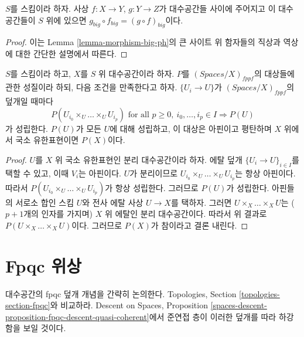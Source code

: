 \begin{lemma}
\label{lemma-composition-ph}
$S$를 스킴이라 하자. 사상 $f : X \to Y$, $g : Y \to Z$가 대수공간들
사이에 주어지고 이 대수공간들이 $S$ 위에 있으면
$g_{big} \circ f_{big} = (g \circ f)_{big}$이다.
\end{lemma}

\begin{proof}
이는 Lemma \ref{lemma-morphism-big-ph}의 큰 사이트 위 함자들의 직상과
역상에 대한 간단한 설명에서 따른다.
\end{proof}

\begin{lemma}
\label{lemma-cech-enough}
$S$를 스킴이라 하고, $X$를 $S$ 위 대수공간이라 하자. $P$를
$(\textit{Spaces}/X)_{fppf}$의 대상들에 관한 성질이라 하되, 다음 조건을
만족한다고 하자. $\{U_i \to U\}$가 $(\textit{Spaces}/X)_{fppf}$의
덮개일 때마다
$$
P(U_{i_0} \times_U \ldots \times_U U_{i_p})
\text{ for all }
p \geq 0,\ i_0, \ldots, i_p \in I
\Rightarrow P(U)
$$
가 성립한다. $P(U)$가 모든 $U$에 대해 성립하고, 이 대상은 아핀이고
평탄하며 $X$ 위에서 국소 유한표현이면 $P(X)$이다.
\end{lemma}

\begin{proof}
$U$를 $X$ 위 국소 유한표현인 분리 대수공간이라 하자. 에탈 덮개
$\{U_i \to U\}_{i \in I}$를 택할 수 있고, 이때 $V_i$는 아핀이다.
$U$가 분리이므로
$U_{i_0} \times_U \ldots \times_U U_{i_p}$는 항상 아핀이다. 따라서
$P(U_{i_0} \times_U \ldots \times_U U_{i_p})$가 항상 성립한다. 그러므로
$P(U)$가 성립한다. 아핀들의 서로소 합인 스킴 $U$와 전사 에탈 사상
$U \to X$를 택하자. 그러면 $U \times_X \ldots \times_X U$는
($p + 1$개의 인자를 가지며) $X$ 위 에탈인 분리 대수공간이다. 따라서
위 결과로 $P(U \times_X \ldots \times_X U)$이다. 그러므로 $P(X)$가
참이라고 결론 내린다.
\end{proof}










\section{Fpqc 위상}
\label{section-fpqc}

\noindent
대수공간의 fpqc 덮개 개념을 간략히 논의한다. Topologies, Section
\ref{topologies-section-fpqc}와 비교하라. Descent on Spaces, Proposition
\ref{spaces-descent-proposition-fpqc-descent-quasi-coherent}에서 준연접 층이
이러한 덮개를 따라 하강함을 보일 것이다.

